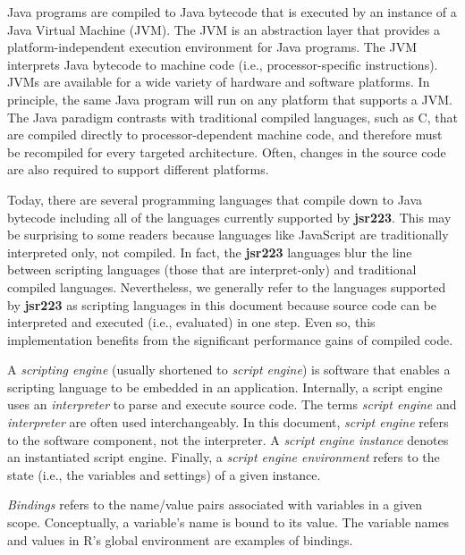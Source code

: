 Java programs are compiled to Java bytecode that is executed by an instance of a Java Virtual Machine (JVM). The JVM is an abstraction layer that provides a platform-independent execution environment for Java programs. The JVM interprets Java bytecode to machine code (i.e., processor-specific instructions). JVMs are available for a wide variety of hardware and software platforms. In principle, the same Java program will run on any platform that supports a JVM. The Java paradigm contrasts with traditional compiled languages, such as C, that are compiled directly to processor-dependent machine code, and therefore must be recompiled for every targeted architecture. Often, changes in the source code are also required to support different platforms.

Today, there are several programming languages that compile down to Java bytecode including all of the languages currently supported by \textbf{jsr223}. This may be surprising to some readers because languages like JavaScript are traditionally interpreted only, not compiled. In fact, the \textbf{jsr223} languages blur the line between scripting languages (those that are interpret-only) and traditional compiled languages. Nevertheless, we generally refer to the languages supported by \textbf{jsr223} as scripting languages in this document because source code can be interpreted and executed (i.e., evaluated) in one step. Even so, this implementation benefits from the significant performance gains of compiled code.

A \textit{scripting engine} (usually shortened to \textit{script engine}) is software that enables a scripting language to be embedded in an application. Internally, a script engine uses an \textit{interpreter} to parse and execute source code. The terms \textit{script engine} and \textit{interpreter} are often used interchangeably. In this document, \textit{script engine} refers to the software component, not the interpreter. A \textit{script engine instance} denotes an instantiated script engine. Finally, a \textit{script engine environment} refers to the state (i.e., the variables and settings) of a given instance.

\textit{Bindings} refers to the name/value pairs associated with variables in a given scope. Conceptually, a variable's name is bound to its value. The variable names and values in R's global environment are examples of bindings.
